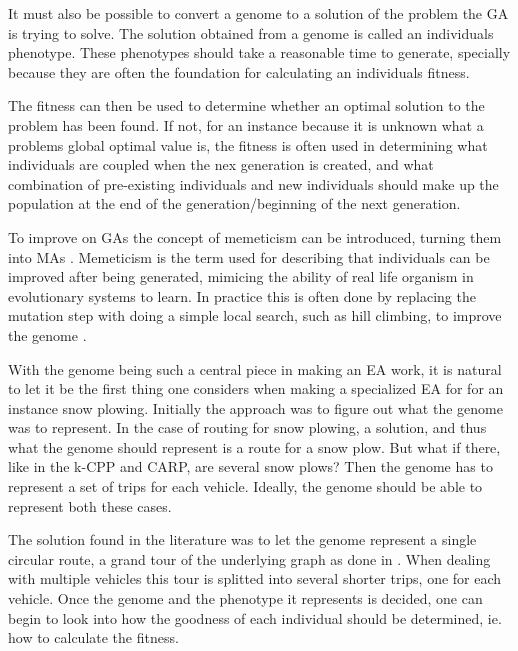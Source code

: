 It must also be possible to convert a genome to a solution of the problem the GA is trying to solve. The solution obtained from a genome is called an individuals phenotype. These phenotypes should take a reasonable time to generate, specially because they are often the foundation for calculating an individuals fitness.

The fitness can then be used to determine whether an optimal solution to the problem has been found. If not, for an instance because it is unknown what a problems global optimal value is, the fitness is often used in determining what individuals are coupled when the nex generation is created, and what combination of pre-existing individuals and new individuals should make up the population at the end of the generation/beginning of the next generation.

To improve on GAs the concept of memeticism can be introduced, turning them into MAs \citep{moscato1989memeticism}. Memeticism is the term used for describing that individuals can be improved after being generated, mimicing the ability of real life organism in evolutionary systems to learn. In practice this is often done by replacing the mutation step with doing a simple local search, such as hill climbing, to improve the genome \citep{lacomme2004competitiveMA}.

With the genome being such a central piece in making an EA work, it is natural to let it be the first thing one considers when making a specialized EA for for an instance snow plowing. Initially the approach was to figure out what the genome was to represent. In the case of routing for snow plowing, a solution, and thus what the genome should represent is a route for a snow plow. But what if there, like in the k-CPP and CARP, are several snow plows? Then the genome has to represent a set of trips for each vehicle. Ideally, the genome should be able to represent both these cases.

The solution found in the literature was to let the genome represent a single circular route, a grand tour of the underlying graph as done in \citet{lacomme2001GA}. When dealing with multiple vehicles this tour is splitted into several shorter trips, one for each vehicle. Once the genome and the phenotype it represents is decided, one can begin to look into how the goodness of each individual should be determined, ie. how to calculate the fitness.


